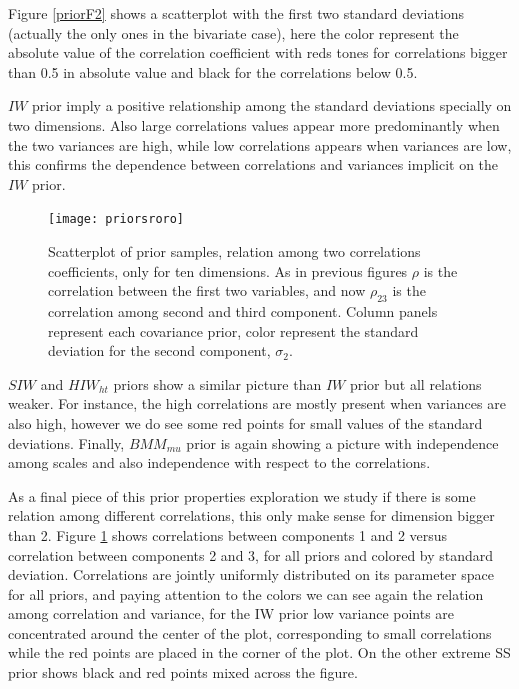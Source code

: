 \documentclass{article}
\begin{document}
Figure \ref{priorF2} shows a scatterplot with the first two standard deviations (actually the only ones in the bivariate case), here the color represent the absolute value of the correlation coefficient with reds tones for correlations bigger than 0.5 in absolute value and black for the correlations below 0.5. 

$IW$ prior imply a positive relationship among the standard deviations specially on two dimensions. Also large correlations values appear more predominantly when the two variances are high, while low correlations appears when variances are low, this confirms the dependence between correlations and variances implicit on the $IW$ prior. 

\begin{figure}[htbp]
\begin{center}
 \texttt{[image: priorsroro]} 
  \vspace{-.5in}
\caption{Scatterplot of prior samples, relation among two correlations coefficients, only for ten dimensions. As in previous figures $\rho$ is the correlation between the first two variables, and now $\rho_{23}$ is the correlation among second and third component. Column panels represent each covariance prior, color represent the standard deviation for the second component, $\sigma_2$. \label{roro}}
\end{center}
\end{figure}

$SIW$ and $HIW_{ht}$ priors show a similar picture than $IW$ prior but all relations weaker. For instance, the high correlations are mostly present when variances are also high, however we do see some red points for small values of the standard deviations. 
Finally,  $BMM_{mu}$ prior is again showing a picture with independence among scales and also independence with respect to the correlations. 

As a final piece of this prior properties exploration we study if there is some relation among different correlations, this only make sense for dimension bigger than 2. Figure \ref{roro} shows correlations between components 1 and 2 versus correlation between components 2 and 3, for all priors and colored by standard deviation. Correlations are jointly uniformly distributed on its parameter space for all priors, and paying attention to the colors we can see again the relation among correlation and variance, for the IW prior low variance points are concentrated around the center of the plot, corresponding to small correlations while the red points are placed in the corner of the plot. On the other extreme SS prior shows black and red points mixed across the figure. 
\end{document}
